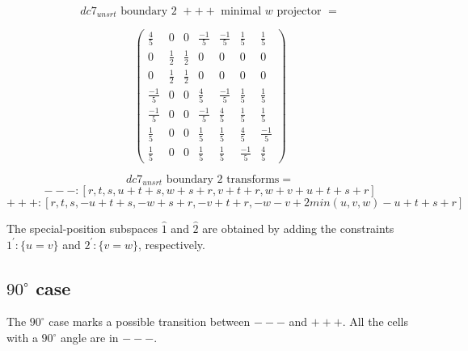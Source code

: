 \documentclass[preprint]{iucr}              %
\begin{document}
{\begin{itemize}
{\[dc7_{unsrt} \text{ boundary 2 } +++ \text{ minimal }w \text{ projector } =\]
\begin{center}
\begin{equation*}
\begin{pmatrix}
\frac{4}{5}&0&0&\frac{-1}{5}&\frac{-1}{5}&\frac{1}{5}&\frac{1}{5}\\[.25em]
0&\frac{1}{2}&\frac{1}{2}&0&0&0&0\\[.25em]
0&\frac{1}{2}&\frac{1}{2}&0&0&0&0\\[.25em]
\frac{-1}{5}&0&0&\frac{4}{5}&\frac{-1}{5}&\frac{1}{5}&\frac{1}{5}\\[.25em]
\frac{-1}{5}&0&0&\frac{-1}{5}&\frac{4}{5}&\frac{1}{5}&\frac{1}{5}\\[.25em]
\frac{1}{5}&0&0&\frac{1}{5}&\frac{1}{5}&\frac{4}{5}&\frac{-1}{5}\\[.25em]
\frac{1}{5}&0&0&\frac{1}{5}&\frac{1}{5}&\frac{-1}{5}&\frac{4}{5}
\end{pmatrix}
\end{equation*}
\end{center}



 \[dc7_{unsrt} \text{ boundary 2 transforms}=\]
 \[ ---: [r,t,s,u+t+s,w+s+r,v+t+r,w+v+u+t+s+r] \]
 \[ +++: [r,t,s,-u+t+s,-w+s+r,-v+t+r,-w-v+2 min(u,v,w)-u+t+s+r]\]
}
 \end{itemize}
 
 The special-position subspaces $\hat{1}$ and $\hat{2}$ are obtained by adding the constraints $1^\prime\!: \{u = v\}$ and
 $2^\prime\!:\{v=w\}$, respectively.

 \subsection{$90^\circ$ case}
 
 The $90^\circ$ case marks a possible transition between $---$ and $+++$.
 All the cells with a $90^\circ$ angle are in $---$.

}
\end{document}

